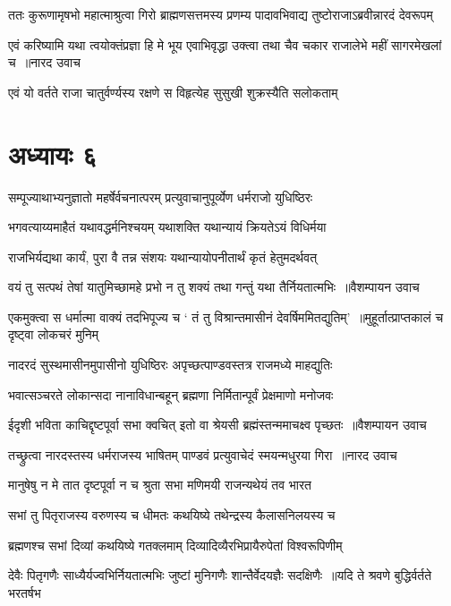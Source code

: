 \twolineshloka
{ततः कुरूणामृषभो महात्माश्रुत्वा गिरो ब्राह्मणसत्तमस्य}
{प्रणम्य पादावभिवाद्य तुष्टोराजाऽब्रवीन्नारदं देवरूपम्}


\threelineshloka
{एवं करिष्यामि यथा त्वयोक्तंप्रज्ञा हि मे भूय एवाभिवृद्धा}
{उक्त्वा तथा चैव चकार राजालेभे महीं सागरमेखलां च ॥नारद उवाच}
{}


\twolineshloka
{एवं यो वर्तते राजा चातुर्वर्ण्यस्य रक्षणे}
{स विहृत्येह सुसुखी शुक्रस्यैति सलोकताम्}


\chapter{अध्यायः ६}
\twolineshloka
{सम्पूज्याथाभ्यनुज्ञातो महर्षेर्वचनात्परम्}
{प्रत्युवाचानुपूर्व्येण धर्मराजो युधिष्ठिरः}


\twolineshloka
{भगवत्याय्यमाहैतं यथावद्धर्मनिश्चयम्}
{यथाशक्ति यथान्यायं क्रियतेऽयं विधिर्मया}


\twolineshloka
{राजभिर्यद्यथा कार्यं, पुरा वै तन्न संशयः}
{यथान्यायोपनीतार्थं कृतं हेतुमदर्थवत्}


\threelineshloka
{वयं तु सत्पथं तेषां यातुमिच्छामहे प्रभो}
{न तु शक्यं तथा गन्तुं यथा तैर्नियतात्मभिः ॥वैशम्पायन उवाच}
{}


\twolineshloka
{एकमुक्त्वा स धर्मात्मा वाक्यं तदभिपूज्य च}
{` तं तु विश्रान्तमासीनं देवर्षिममितद्युतिम्' ॥मुहूर्तात्प्राप्तकालं च दृष्ट्वा लोकचरं मुनिम्}


\twolineshloka
{नादरदं सुस्थमासीनमुपासीनो युधिष्ठिरः}
{अपृच्छत्पाण्डवस्तत्र राजमध्ये माहद्युतिः}


\threelineshloka
{भवात्सञ्चरते लोकान्सदा नानाविधान्बहून्}
{ब्रह्मणा निर्मितान्पूर्वं प्रेक्षमाणो मनोजवः}
{}


\threelineshloka
{ईदृशी भविता काचिद्दृष्टपूर्वा सभा क्वचित्}
{इतो वा श्रेयसी ब्रह्मंस्तन्ममाचक्ष्व पृच्छतः ॥वैशम्पायन उवाच}
{}


\threelineshloka
{तच्छ्रुत्वा नारदस्तस्य धर्मराजस्य भाषितम्}
{पाण्डवं प्रत्युवाचेदं स्मयन्मधुरया गिरा ॥नारद उवाच}
{}


\twolineshloka
{मानुषेषु न मे तात दृष्टपूर्वा न च श्रुता}
{सभा मणिमयी राजन्यथेयं तव भारत}


\twolineshloka
{सभां तु पितृराजस्य वरुणस्य च धीमतः}
{कथयिष्ये तथेन्द्रस्य कैलासनिलयस्य च}


\twolineshloka
{ब्रह्मणश्च सभां दिव्यां कथयिष्ये गतक्लमाम्}
{दिव्यादिव्यैरभिप्रायैरुपेतां विश्वरूपिणीम्}


\twolineshloka
{देवैः पितृगणैः साध्यैर्यज्वभिर्नियतात्मभिः}
{जुष्टां मुनिगणैः शान्तैर्वेदयज्ञैः सदक्षिणैः ॥यदि ते श्रवणे बुद्धिर्वर्तते भरतर्षभ}


